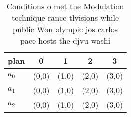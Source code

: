 \documentclass[a4paper]{article}
\begin{document}
\begin{table}
\begin{adjustbox}{width=0.8\columnwidth}
\begin{tabular}{|l|l|l|l|l|}
\hline
\textbf{plan} & \multicolumn{1}{c|}{\textbf{0}} & \multicolumn{1}{c|}{\textbf{1}} & \multicolumn{1}{c|}{\textbf{2}} & \multicolumn{1}{c|}{\textbf{3}} \\ \hline
\textbf{$a_0$}  & (0,0) & (1,0) & (2,0) & (3,0) \\ \hline
\textbf{$a_1$}  & (0,0) & (1,0) & (2,0) & (3,0) \\ \hline
\textbf{$a_2$}  & (0,0) & (1,0) & (2,0) & (3,0) \\ \hline
\end{tabular}
\end{adjustbox}
\caption{Conditions o met the Modulation technique rance tlvisions while public Won olympic jos carlos pace hosts the djvu washi
}
\end{table}
\end{document}
